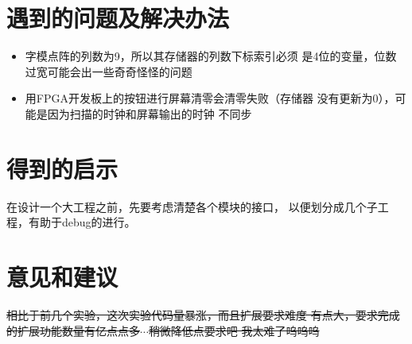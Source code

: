 \documentclass[12pt,a4paper,UTF8]{article}
\begin{document}
\section{遇到的问题及解决办法}
\begin{itemize}
  \item 字模点阵的列数为9，所以其存储器的列数下标索引必须
        是4位的变量，位数过宽可能会出一些奇奇怪怪的问题
  \item 用FPGA开发板上的按钮进行屏幕清零会清零失败（存储器
        没有更新为0），可能是因为扫描的时钟和屏幕输出的时钟
        不同步
\end{itemize}


\section{得到的启示}
在设计一个大工程之前，先要考虑清楚各个模块的接口，
以便划分成几个子工程，有助于debug的进行。


\section{意见和建议}
\sout{相比于前几个实验，这次实验代码量暴涨，而且扩展要求难度
  有点大，要求完成的扩展功能数量有亿点点多$\cdots$稍微降低点要求吧
  我太难了呜呜呜}
\end{document}
